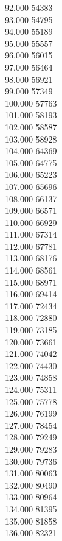 { 92.000	54383 \\
 93.000	54795 \\
 94.000	55189 \\
 95.000	55557 \\
 96.000	56015 \\
 97.000	56464 \\
 98.000	56921 \\
 99.000	57349 \\
 100.000	57763 \\
 101.000	58193 \\
 102.000	58587 \\
 103.000	58928 \\
 104.000	64369 \\
 105.000	64775 \\
 106.000	65223 \\
 107.000	65696 \\
 108.000	66137 \\
 109.000	66571 \\
 110.000	66929 \\
 111.000	67314 \\
 112.000	67781 \\
 113.000	68176 \\
 114.000	68561 \\
 115.000	68971 \\
 116.000	69414 \\
 117.000	72434 \\
 118.000	72880 \\
 119.000	73185 \\
 120.000	73661 \\
 121.000	74042 \\
 122.000	74430 \\
 123.000	74858 \\
 124.000	75311 \\
 125.000	75778 \\
 126.000	76199 \\
 127.000	78454 \\
 128.000	79249 \\
 129.000	79283 \\
 130.000	79736 \\
 131.000	80063 \\
 132.000	80490 \\
 133.000	80964 \\
 134.000	81395 \\
 135.000	81858 \\
 136.000	82321 \\
}
